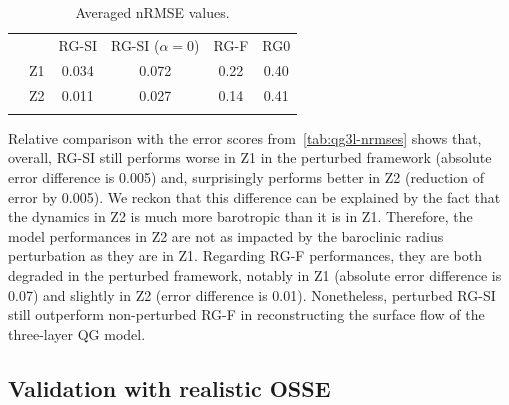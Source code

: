 \documentclass[
  draft
]{agujournal2025}
\begin{document}
\begin{table}[h]
    \begin{center}
        \begin{tabular}{clcccc}
            & & RG-SI & RG-SI ($\alpha = 0$) & RG-F & RG0 \\
            \savehline
            \multirow{2}{*}{nRMSE} & Z1 & 0.034 & 0.072 & 0.22 & 0.40 \\
                                & Z2 & 0.011 & 0.027 & 0.14 & 0.41 \\
            \savehline \\
        \end{tabular}
    \end{center}
    \caption{Averaged nRMSE values.}\label{tab:qg3l-pert-nrmses}
\end{table}

Relative comparison with the error scores from~\cref{tab:qg3l-nrmses} shows that, overall, RG-SI still performs worse in Z1 in the perturbed framework (absolute error difference is 0.005) and, surprisingly performs better in Z2 (reduction of error by 0.005). We reckon that this difference can be explained by the fact that the dynamics in Z2 is much more barotropic than it is in Z1. Therefore, the model performances in Z2 are not as impacted by the baroclinic radius perturbation as they are in Z1.
Regarding RG-F performances, they are both degraded in the perturbed framework, notably in Z1 (absolute error difference is 0.07) and slightly in Z2 (error difference is 0.01). Nonetheless, perturbed RG-SI still outperform non-perturbed RG-F in reconstructing the surface flow of the three-layer QG model.

\subsection{Validation with realistic OSSE}\label{sec:enatl60}
\end{document}
